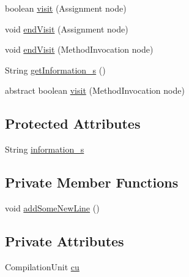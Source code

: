 \begin{DoxyCompactItemize}
\item 
boolean \hyperlink{classit_1_1isislab_1_1masonassisteddocumentation_1_1visitor_1_1_code_visitor_a802b2916ebe1045fd32be378ad5fdc89}{visit} (Assignment node)
\item 
void \hyperlink{classit_1_1isislab_1_1masonassisteddocumentation_1_1visitor_1_1_code_visitor_a02060c3318faa3bbd19f4517ca2b6843}{end\-Visit} (Assignment node)
\item 
void \hyperlink{classit_1_1isislab_1_1masonassisteddocumentation_1_1visitor_1_1_code_visitor_aefe7e1dfda4f465845e03407a198ccc2}{end\-Visit} (Method\-Invocation node)
\item 
String \hyperlink{classit_1_1isislab_1_1masonassisteddocumentation_1_1visitor_1_1_code_visitor_aa68511a2fe4ebc5c8dca3694ddd072ed}{get\-Information\-\_\-s} ()
\item 
abstract boolean \hyperlink{classit_1_1isislab_1_1masonassisteddocumentation_1_1visitor_1_1_code_visitor_aa4e0bbbc1f0226abcf00be8c384a18fb}{visit} (Method\-Invocation node)
\end{DoxyCompactItemize}
\subsection*{Protected Attributes}
\begin{DoxyCompactItemize}
\item 
String \hyperlink{classit_1_1isislab_1_1masonassisteddocumentation_1_1visitor_1_1_code_visitor_a628ab846d2f4de647f171060ebe73774}{information\-\_\-s}
\end{DoxyCompactItemize}
\subsection*{Private Member Functions}
\begin{DoxyCompactItemize}
\item 
void \hyperlink{classit_1_1isislab_1_1masonassisteddocumentation_1_1visitor_1_1_code_visitor_a31af3e78c358dfc103b9ed9348fba615}{add\-Some\-New\-Line} ()
\end{DoxyCompactItemize}
\subsection*{Private Attributes}
\begin{DoxyCompactItemize}
\item 
Compilation\-Unit \hyperlink{classit_1_1isislab_1_1masonassisteddocumentation_1_1visitor_1_1_code_visitor_ad567a4c5516729e6ad3c520b779e5fbf}{cu}
\end{DoxyCompactItemize}


